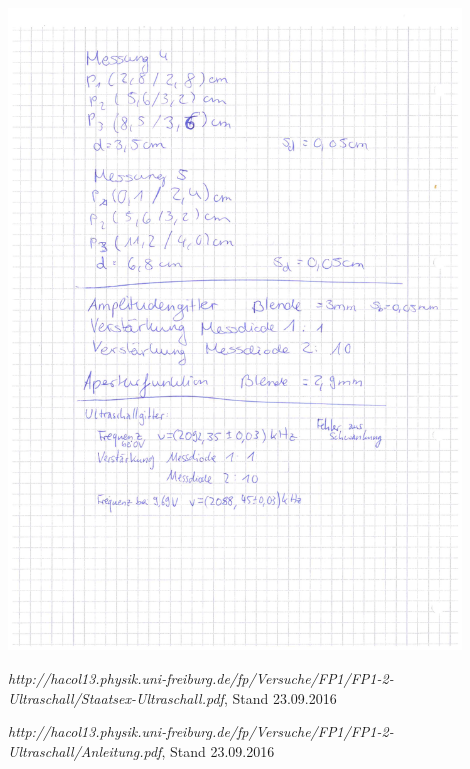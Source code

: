 \documentclass[12pt]{article}
\begin{document}
\begin{minipage}{\textwidth}
\centering
\includegraphics[width=0.9\textwidth]{figures/Laborbuch1.pdf}
\end{minipage}
\newpage
\listoffigures


\newpage
\thispagestyle{empty}
\begin{thebibliography}{9}

  

  
  
\emph{http://hacol13.physik.uni-freiburg.de/fp/Versuche/FP1/FP1-2-Ultraschall/Staatsex-Ultraschall.pdf}, Stand 23.09.2016

\emph{http://hacol13.physik.uni-freiburg.de/fp/Versuche/FP1/FP1-2-Ultraschall/Anleitung.pdf}, Stand 23.09.2016


\end{thebibliography}
\end{document}
